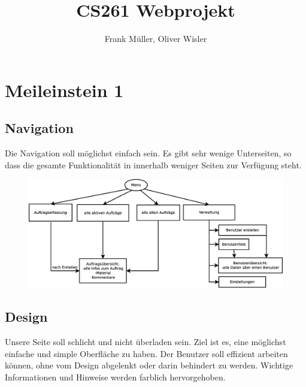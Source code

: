 \documentclass[ngerman, 12pt, pdftex]{scrartcl}[2006/07/30]
\title{CS261 Webprojekt}
\author{Frank Müller, Oliver Wisler}
\begin{document}
\pagestyle{fancy}
\fancyhf{} 
\renewcommand{\headrulewidth}{0.1pt} 	%
\fancyfoot[C]{\thepage} 				%




\tableofcontents
\newpage


\section{Meileinstein 1}
\subsection{Navigation}
Die Navigation soll möglichst einfach sein. Es gibt sehr wenige Unterseiten, so dass die gesamte Funktionalität in innerhalb weniger Seiten zur Verfügung steht. 
\begin{figure}[h!]
\center
	\includegraphics[scale=0.35]{./navigation.eps}
	
\end{figure}


\subsection{Design}
Unsere Seite soll schlicht und nicht überladen sein. Ziel ist es, eine möglichst einfache und simple Oberfläche zu haben. Der Benutzer soll effizient arbeiten können, ohne vom Design abgelenkt oder darin behindert zu werden.
Wichtige Informationen und Hinweise werden farblich hervorgehoben.
\end{document}
